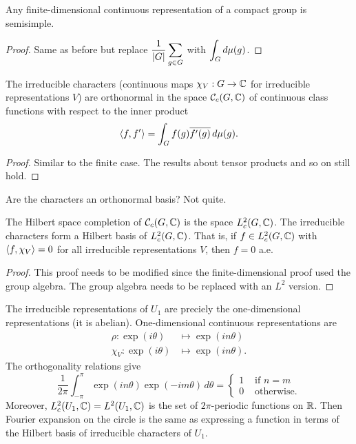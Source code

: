 \begin{thm}
  Any finite-dimensional continuous representation of a compact group is semisimple.
\end{thm}

\begin{proof}
  Same as before but replace $\displaystyle \frac{1}{\left\lvert G \right\rvert} \sum_{g \in G}$ with $\displaystyle \int_G d\mu(g)$.
\end{proof}

\begin{thm}
  The irreducible characters (continuous maps $\chi_V: G \to \mathbb{C}$ for irreducible representations $V$) are orthonormal in the space $\mathcal{C}_c(G,\mathbb{C})$ of continuous class functions with respect to the inner product
  \[ {\left\langle f,f' \right\rangle} = \int_G f(g) \overline{f'(g)} \, d\mu(g).\]
\end{thm}

\begin{proof}
  Similar to the finite case.
  The results about tensor products and so on still hold.
\end{proof}

Are the characters an orthonormal basis? Not quite.

\begin{thm}
  The Hilbert space completion of $\mathcal{C}_c(G,\mathbb{C})$ is the space $L_c^2(G,\mathbb{C})$.
  The irreducible characters form a Hilbert basis of $L^2_c(G,\mathbb{C})$.
  That is, if $f \in L^2_c(G,\mathbb{C})$ with ${\left\langle f,\chi_V \right\rangle}=0$ for all irreducible representations $V$, then $f=0$ a.e.
\end{thm}

\begin{proof}
  This proof needs to be modified since the finite-dimensional proof used the group algebra.
  The group algebra needs to be replaced with an $L^2$ version.
\end{proof}

\begin{exam}
  The irreducible representations of $U_1$ are preciely the one-dimensional representations (it is abelian).
  One-dimensional continuous representations are
  \begin{align*}
    \rho: \exp(i\theta) &\mapsto \exp(in\theta) \\
    \chi_V: \exp(i\theta) &\mapsto \exp(in\theta).
  \end{align*}
  The orthogonality relations give
  \[ \frac{1}{2\pi} \int_{-\pi}^\pi \exp(in\theta) \exp(-im\theta) \, d\theta =
    \begin{cases}
      1 & \text{ if } n=m \\
      0 & \text{ otherwise}.
    \end{cases}
  \]
  Moreover, $L^2_c(U_1,\mathbb{C})=L^2(U_1,\mathbb{C})$ is the set of $2\pi$-periodic functions on $\mathbb{R}$.
  Then Fourier expansion on the circle is the same as expressing a function in terms of the Hilbert basis of irreducible characters of $U_1$.
\end{exam}

